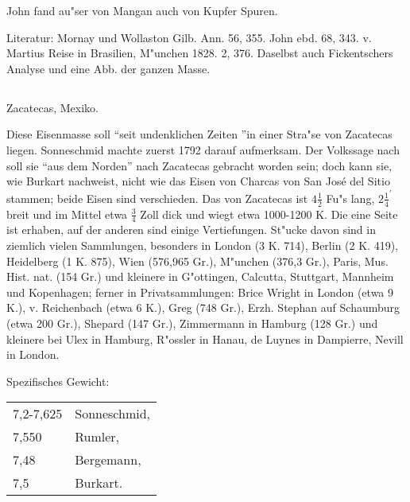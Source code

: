 \documentclass[a4paper, 11pt, oneside]{article}
\begin{document}
John fand au"ser von Mangan auch von Kupfer Spuren.

\normalsize
Literatur: Mornay und Wollaston Gilb. Ann. 56, 355. John ebd. 68, 343. v. Martius Reise in Brasilien, M"unchen 1828. 2, 376. Daselbst auch Fickentschers Analyse und eine Abb. der ganzen Masse.

\subsection{}
\LARGE
\paragraph{}
Zacatecas, Mexiko.

Diese Eisenmasse soll "`seit undenklichen Zeiten "'in einer Stra"se von Zacatecas liegen. Sonneschmid machte zuerst 1792 darauf aufmerksam. Der Volkssage nach soll sie "`aus dem Norden"' nach Zacatecas gebracht worden sein; doch kann sie, wie Burkart nachweist, nicht wie das Eisen von Charcas von San José del Sitio stammen; beide Eisen sind verschieden. Das von Zacatecas ist $\mathfrak{4\frac{1}{2}}$ Fu"s lang, $\mathfrak{2\frac{1}{4}^\prime}$ breit und im Mittel etwa $\mathfrak{\frac{3}{4}}$ Zoll dick und wiegt etwa 1000-1200 K. Die eine Seite ist erhaben, auf der anderen sind einige Vertiefungen. St"ucke davon sind in ziemlich vielen Sammlungen, besonders in London (3 K. 714), Berlin (2 K. 419), Heidelberg (1 K. 875), Wien (576,965 Gr.), M"unchen (376,3 Gr.), Paris, Mus. Hist. nat. (154 Gr.) und kleinere in G"ottingen, Calcutta, Stuttgart, Mannheim und Kopenhagen; ferner in Privatsammlungen: Brice Wright in London (etwa 9 K.), v. Reichenbach (etwa 6 K.), Greg (748 Gr.), Erzh. Stephan auf Schaumburg (etwa 200 Gr.), Shepard (147 Gr.), Zimmermann in Hamburg (128 Gr.) und kleinere bei Ulex in Hamburg, R"ossler in Hanau, de Luynes in Dampierre, Nevill in London.

Spezifisches Gewicht:  
\begin{table}[!ht]
    \centering\swabfamily\Large
    \begin{tabular}{l l}
        7,2-7,625 & Sonneschmid,\\
        7,550 & Rumler,\\
        7,48 & Bergemann,\\
        7,5 & Burkart.
    \end{tabular}
\end{table}
\end{document}

